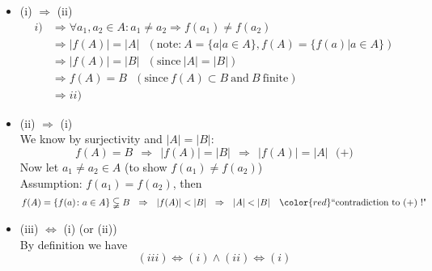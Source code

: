 {\color{solution}
\begin{itemize}
	\item (i) $\Rightarrow$ (ii) \\
	\begin{align*}
	i) 
	&\Rightarrow \forall a_1,a_2 \in A: a_1 \neq a_2 \Rightarrow f(a_1) \neq f(a_2)  \\
	&\Rightarrow |f(A)| = |A|~~~(\text{note:}~A=\{ a | a \in A\},f(A) = \{ f(a) | a \in A\}  )\\
	&\Rightarrow |f(A)| = |B| ~~~(\text{since}~|A|=|B|) \\
	&\Rightarrow f(A) = B ~~~(\text{since}~ f(A)\subset B~\text{and}~B~\text{finite}) \\
	&\Rightarrow ii)
	\end{align*}
	\item (ii) $\Rightarrow$ (i)\\
	We know by surjectivity and $|A| = |B|$: 
	$$ f(A) = B ~~\Rightarrow~~ |f(A)|=|B|~~ \Rightarrow ~~|f(A)|=|A|~~~\text{(+)}$$
	Now let $a_1\neq a_2 \in A$ (to show $f(a_1)\neq f(a_2)$)\\
	Assumption: $f(a_1)= f(a_2)$, then
	\begin{align*}
	f(A) = \{f(a)\colon a\in A\} \subsetneqq B  ~~\Rightarrow~~ |f(A)| < |B|  ~~\Rightarrow~~ |A| < |B| ~~~{\color{red}\text{``contradiction to (+) !"}}
	\end{align*}
	\item (iii) $\Leftrightarrow$ (i) (or (ii))\\
	By definition we have 
	$$(iii) \Leftrightarrow (i) \land (ii) \Leftrightarrow (i) $$
\end{itemize}
}